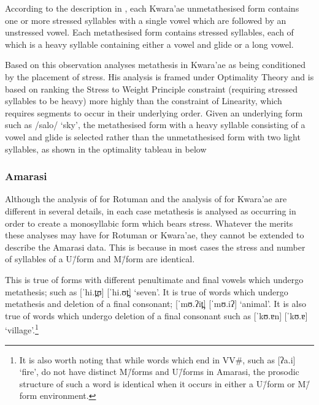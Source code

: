 According to the description in \citet{he04},
each Kwara'ae unmetathesised form
contains one or more stressed syllables with a single vowel
which are followed by an unstressed vowel.
Each metathesised form contains stressed syllables,
each of which is a heavy syllable containing either
a vowel and glide or a long vowel.

Based on this observation \cite{he04} analyses metathesis in Kwara'ae
as being conditioned by the placement of stress.
His analysis is framed under Optimality Theory
and is based on ranking the Stress to Weight Principle constraint (requiring
stressed syllables to be heavy) more highly than the constraint of Linearity,
which requires segments to occur in their underlying order.
Given an underlying form such as /salo/ `sky',
the metathesised form with a heavy syllable consisting of a vowel and glide
is selected rather than the unmetathesised form with two light syllables,
as shown in the optimality tableau in  below

\begin{exe}
		\label{KwMetOT}
\end{exe}

\subsubsection{Amarasi}
Although the analysis of \cite{mcc00} for Rotuman
and the analysis of \cite{he04} for Kwara'ae
are different in several details,
in each case metathesis is analysed as occurring in
order to create a monosyllabic form which bears stress.
Whatever the merits these analyses may have for Rotuman or Kwara'ae,
they cannot be extended to describe the Amarasi data.
This is because in most cases the stress
and number of syllables of a U\=/form and M\=/form are identical.

This is true of forms with different penultimate and final vowels
which undergo metathesis; such as  [ˈhi.t̪ʊ] {\ra}  [ˈhi.ʊt̪] `seven'.
It is true of words which undergo metathesis and deletion of a final consonant;
 [ˈmʊ.ʔit̪] {\ra}  [ˈmʊ.iʔ] `animal'.
It is also true of words which undergo deletion of a final consonant
such as  [ˈkʊ.ɐn] {\ra}  [ˈkʊ.ɐ] `village'.\footnote{
		It is also worth noting that while words which end in VV{\#},
		such as  [ʔa.i] `fire',
		do not have distinct M\=/forms and U\=/forms in Amarasi,
		the prosodic structure of such a word is identical
		when it occurs in either a U\=/form or M\=/form environment.}

